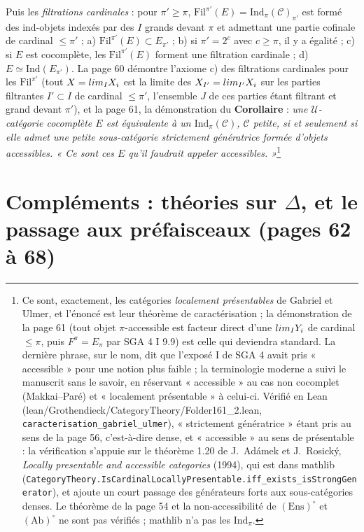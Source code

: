 \documentclass[11pt,a4paper]{article}
\begin{document}
Puis les \emph{filtrations cardinales} : pour $\pi' \geqslant \pi$,
$\mathrm{Fil}^{\pi'}(E) = \mathrm{Ind}_{\pi}(\mathcal{C})_{\pi'}$ est formé
des ind-objets indexés par des $I$ grands devant $\pi$ et admettant une
partie cofinale de cardinal $\leqslant \pi'$ ; a) $\mathrm{Fil}^{\pi'}(E)
\subset E_{\pi'}$ ; b) si $\pi' = 2^{c}$ avec $c \geqslant \pi$, il y a
égalité ; c) si $E$ est cocomplète, les $\mathrm{Fil}^{\pi'}(E)$ forment
une filtration cardinale ; d) $E \simeq \mathrm{Ind}(E_{\pi'})$. La page 60
démontre l'axiome c) des filtrations cardinales pour les
$\mathrm{Fil}^{\pi'}$ (tout $X = \varinjlim_{I} X_{i}$ est la limite des
$X_{I'} = \varinjlim_{I'} X_{i}$ sur les parties filtrantes $I' \subset I$
de cardinal $\leqslant \pi'$, l'ensemble $J$ de ces parties étant filtrant
et grand devant $\pi'$), et la page 61, la démonstration du
\textbf{Corollaire} : \emph{une $\mathcal{U}$-catégorie cocomplète $E$ est
équivalente à un $\mathrm{Ind}_{\pi}(\mathcal{C})$, $\mathcal{C}$ petite, si
et seulement si elle admet une petite sous-catégorie strictement
génératrice formée d'objets accessibles. « Ce sont ces $E$ qu'il faudrait
appeler accessibles. »}\footnote{Ce sont, exactement, les catégories
\emph{localement présentables} de Gabriel et Ulmer, et l'énoncé est leur
théorème de caractérisation ; la démonstration de la page 61 (tout objet
$\pi$-accessible est facteur direct d'une $\varinjlim_{I} Y_{i}$ de
cardinal $\leqslant \pi$, puis $F^{\pi} = E_{\pi}$ par SGA 4 I 9.9) est
celle qui deviendra standard. La dernière phrase, sur le nom, dit que
l'exposé I de SGA 4 avait pris « accessible » pour une notion plus faible ;
la terminologie moderne a suivi le manuscrit sans le savoir, en réservant
« accessible » au cas non cocomplet (Makkai--Paré) et « localement
présentable » à celui-ci. Vérifié en Lean (lean/Grothendieck/CategoryTheory/Folder161\_2.lean,
\texttt{caracterisation\_gabriel\_ulmer}), « strictement génératrice » étant
pris au sens de la page 56, c'est-à-dire dense, et « accessible » au sens de
présentable : la vérification s'appuie sur le théorème 1.20 de J.~Adámek et
J.~Rosický, \emph{Locally presentable and accessible categories} (1994), qui
est dans mathlib
(\texttt{CategoryTheory.IsCardinalLocallyPresentable.iff\_exists\_isStrongGenerator}),
et ajoute un court passage des générateurs forts aux sous-catégories
denses. Le théorème de la page 54 et la non-accessibilité de
$(\mathrm{Ens})^{\circ}$ et $(\mathrm{Ab})^{\circ}$ ne sont pas vérifiés ;
mathlib n'a pas les $\mathrm{Ind}_{\pi}$.}

\section*{Compléments : théories sur $\Delta$, et le passage aux préfaisceaux (pages 62 à 68)}
\end{document}
